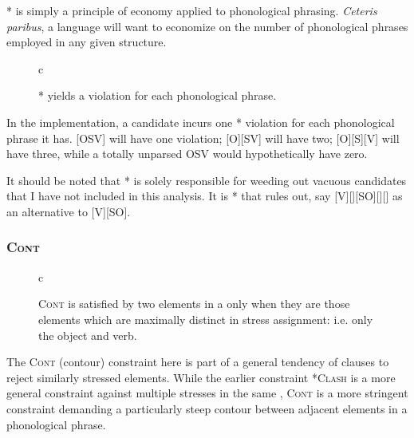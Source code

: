 \documentclass{article}
\newcommand{\noclash}{\textsc{*Clash}}
\newcommand{\cont}{\textsc{Cont}}
\newcommand{\nophi}{\textsc{*\textphi}}
\begin{document}
{\nophi} is simply a principle of economy applied to phonological phrasing.
\textit{Ceteris paribus}, a language will want to economize on the number of phonological phrases employed in any given structure.

\begin{figure}
	\begin{center}
		\begin{tableau}{c}
				\const{\nophi}
			\cand[\Optimal]{[SOV]}	\vio{*}
			\cand{[S][O][V]}	\vio{*!**}
			\cand{[SO][V]}	\vio{*!*}
		\end{tableau}
	\end{center}
\caption{\nophi{} yields a violation for each phonological phrase.}
\end{figure}

In the implementation, a candidate incurs one {\nophi} violation for each phonological phrase it has.
[OSV] will have one violation; [O][SV] will have two; [O][S][V] will have three, while a totally unparsed OSV would hypothetically have zero.

It should be noted that {\nophi} is solely responsible for weeding out vacuous candidates that I have not included in this analysis.
It is {\nophi} that rules out, say [V][][SO][][] as an alternative to [V][SO].

\subsubsection{\cont}

\begin{figure}
\begin{center}
\begin{tableau}{c}
		\const{\cont}
	\cand{[SO][V]} \vio{*!}
	\cand[\Optimal]{[S][VO]} \vio{}
	\cand{[SV][O]} \vio{*!}
\end{tableau}
\end{center}
	\caption{{\cont} is satisfied by two elements in a {\textphi} only when they are those elements which are maximally distinct in stress assignment: i.e. only the object and verb.\label{contour}}
\end{figure}

The {\cont} (contour) constraint here is part of a general tendency of clauses to reject similarly stressed elements.
While the earlier constraint {\noclash} is a more general constraint against multiple stresses in the same {\textphi}, {\cont} is a more stringent constraint demanding a particularly steep contour between adjacent elements in a phonological phrase.
\end{document}
